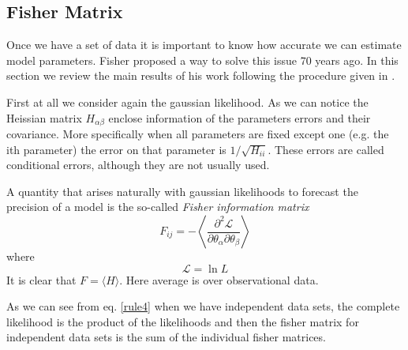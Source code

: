 \documentclass[onecolumn,           %
               showpacs,            %
               preprintnumbers,     %
               aps,                 %
               prl,          	    %
               letterpaper,             %
               superscriptaddress,      %
               nofootinbib,         %
               tightenlines,        %
               floats,floatfix      %
               ,usenatbib,
               ]{revtex4-1}
\begin{document}
\subsection{Fisher Matrix}

Once we have a set of data it is important to know how accurate we can estimate model parameters. Fisher \cite{Fisher} proposed a way to solve this issue 70 years ago. In this section we review the main results of his work following the procedure given in \cite{LiV}.

First at all we consider again the gaussian likelihood. As we can notice the Heissian matrix $H_{\alpha\beta}$ enclose information of the parameters errors and their covariance. More specifically when all parameters are fixed except one (e.g. the ith parameter) the error on that parameter is $1/\sqrt{H_{ii}}$. These errors are called conditional errors, although they are not usually used.

A quantity that arises naturally with gaussian likelihoods to forecast the precision of a model is the so-called \textit{Fisher information matrix}
\begin{equation}
F_{ij}=-\left\langle \frac{\partial^2 \mathcal{L}}{\partial \theta_\alpha \partial \theta_\beta}\right\rangle
\end{equation}
where 
\begin{equation}
\mathcal{L}=\ln L
\end{equation}
It is clear that $F=\langle H\rangle$. Here average is over observational data. 

As we can see from eq. \eqref{rule4} when we have independent data sets, the complete likelihood is the product of the likelihoods and then the fisher matrix for independent data sets is the sum of the individual fisher matrices. 
\end{document}
